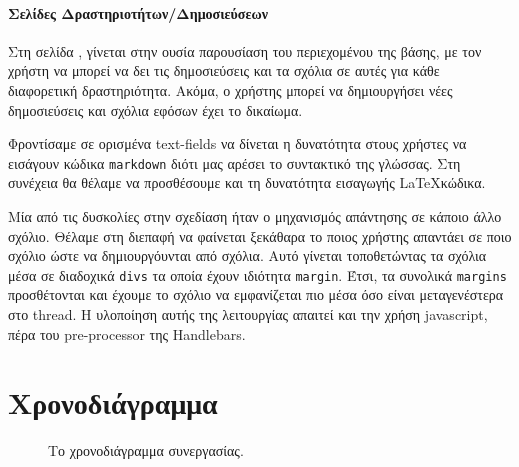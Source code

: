 \documentclass[acmtog, nonacm, language=english, language=greek]{acmart}
\newcommand{\en}[1]{\textlatin{#1}}
\newcommand{\src}[1]{\texttt{\en{#1}}}
\begin{document}
\paragraph{Σελίδες Δραστηριοτήτων/Δημοσιεύσεων}

Στη σελίδα \say{\en{Activities}}, γίνεται στην ουσία παρουσίαση του
περιεχομένου της βάσης, με τον χρήστη να μπορεί να δει τις δημοσιεύσεις και τα
σχόλια σε αυτές για κάθε διαφορετική δραστηριότητα. Ακόμα, ο χρήστης μπορεί να
δημιουργήσει νέες δημοσιεύσεις και σχόλια εφόσων έχει το δικαίωμα.

Φροντίσαμε σε ορισμένα \en{text-fields} να δίνεται η δυνατότητα 
στους χρήστες να εισάγουν κώδικα \src{markdown} διότι
μας αρέσει το συντακτικό της γλώσσας. Στη συνέχεια 
θα θέλαμε να προσθέσουμε και τη δυνατότητα εισαγωγής \LaTeX κώδικα.

Μία από τις δυσκολίες στην σχεδίαση ήταν ο μηχανισμός απάντησης
σε κάποιο άλλο σχόλιο. Θέλαμε στη διεπαφή να φαίνεται 
ξεκάθαρα το ποιος χρήστης απαντάει σε ποιο σχόλιο
ώστε να δημιουργόυνται  από σχόλια.
Αυτό γίνεται τοποθετώντας τα σχόλια μέσα σε διαδοχικά \src{divs}
τα οποία έχουν ιδιότητα \src{margin}. Έτσι, τα συνολικά 
\src{margins} προσθέτονται και έχουμε το σχόλιο να εμφανίζεται πιο μέσα 
όσο είναι μεταγενέστερα στο \en{thread}. Η υλοποίηση αυτής 
της λειτουργίας απαιτεί και την χρήση \en{javascript}, πέρα 
του \en{pre-processor} της \en{Handlebars}.

\section{Χρονοδιάγραμμα}

\begin{figure*}
\begin{center}
\end{center}
    \caption{Το χρονοδιάγραμμα συνεργασίας.}
\end{figure*}


\end{document}
